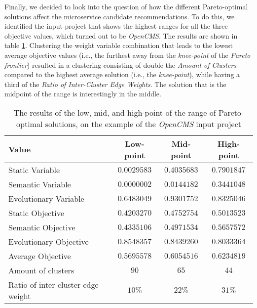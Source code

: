 \documentclass[12pt,a4paper]{report}
\begin{document}
Finally, we decided to look into the question of how the different
Pareto\hyp optimal solutions affect the microservice candidate recommendations.
To do this, we identified the input project that shows the highest ranges for
all the three objective values, which turned out to be \textit{OpenCMS}.
The results are shown in table \ref{table:experiment-4.7}.
Clustering the weight variable combination that leads to the lowest average
objective values (i.e., the furthest away from the \textit{knee\hyp point} of the
\textit{Pareto frontier}) resulted in a clustering consisting of double the
\textit{Amount of Clusters} compared to the highest average solution
(i.e., the \textit{knee\hyp point}),
while having a third of the \textit{Ratio of Inter\hyp Cluster Edge Weights}.
The solution that is the midpoint of the range is interestingly in the middle.

\begin{table}[h!]
\begin{tabularx}{\textwidth}{|X|c|c|c|}
\hline
Value & Low-point & Mid-point & High-point \\
\hline\hline

Static Variable                     & $0.0029583$   & $0.4035683$   & $0.7901847$   \\\hline
Semantic Variable                   & $0.0000002$   & $0.0144182$   & $0.3441048$   \\\hline
Evolutionary Variable               & $0.6483049$   & $0.9301752$   & $0.8325046$   \\\hline
Static Objective                    & $0.4203270$   & $0.4752754$   & $0.5013523$   \\\hline
Semantic Objective                  & $0.4335106$   & $0.4971534$   & $0.5657572$   \\\hline
Evolutionary Objective              & $0.8548357$   & $0.8439260$   & $0.8033364$   \\\hline
Average Objective                   & $0.5695578$   & $0.6054516$   & $0.6234819$   \\\hline
Amount of clusters                  & $90$          & $65$          & $44$          \\\hline
Ratio of inter-cluster edge weight  & $10\%$        & $22\%$        & $31\%$        \\\hline

\end{tabularx}
\caption{The results of the low, mid, and high-point of the range of Pareto\hyp optimal solutions, on the example of the \textit{OpenCMS} input project}
\label{table:experiment-4.7}
\end{table}
\end{document}

